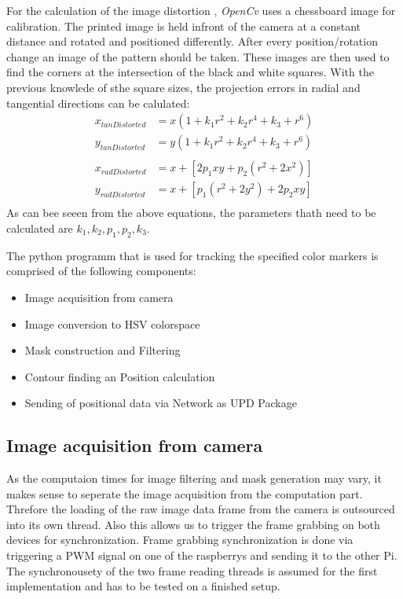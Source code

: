 For the calculation of the image distortion , \textit{OpenCv} uses a chessboard image for calibration. The printed image is held infront of the camera at a constant distance and rotated and positioned differently. After every position/rotation change an image of the pattern should be taken.
These images are then used to find the corners at the intersection of the black and white squares. With the previous knowlede of sthe square sizes, the projection errors in radial and tangential directions can be calulated:
\begin{equation}
\begin{split}
x_{tanDistorted}&=x(1+k_{1}r^{2}+k_{2}r^{4}+k_{3}+r^{6})\\
y_{tanDistorted}&=y(1+k_{1}r^{2}+k_{2}r^{4}+k_{3}+r^{6})\\
\\
x_{radDistorted}&=x+[2p_{1}xy+p_{2}(r^{2}+2x^{2})]\\
y_{radDistorted}&=x+[p_{1}(r^{2}+2y^{2})+2p_{2}xy]\\
\end{split}
\end{equation} 
As can bee seeen from the above equations, the parameters thath need to be calculated are $k_{1},k_{2},p_{1},p_{2},k_{3}$.

The python programm that is used for tracking the specified color markers is comprised of the following components:
\begin{itemize}
\item Image acquisition from camera
\item Image conversion to HSV colorspace
\item Mask construction and Filtering
\item Contour finding an Position calculation
\item Sending of positional data via Network as UPD Package
\end{itemize}

\subsection{Image acquisition from camera}
As the computaion times for image filtering and mask generation may vary, it makes sense to seperate the image acquisition from the computation part. Threfore the loading of the raw image data frame from the camera is outsourced into its own thread. Also this allows us to trigger the frame grabbing on both devices for synchronization. Frame grabbing synchronization is done via triggering a PWM signal on one of the raspberrys and sending it to the other Pi.
The synchronousety of the two frame reading threads is assumed for the first implementation and has to be tested on a finished setup.

